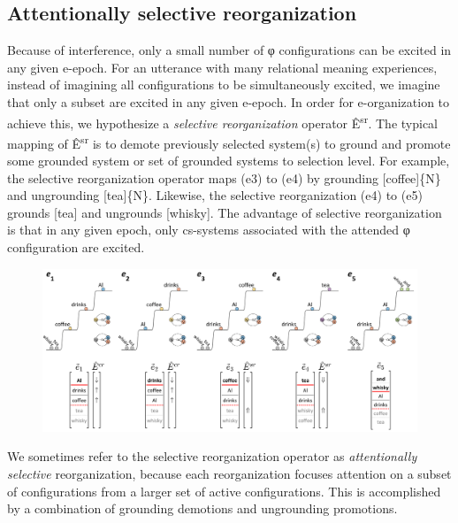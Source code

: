 \subsection{Attentionally selective reorganization}

Because of interference, only a small number of φ configurations can be excited in any given e-epoch. For an utterance with many relational meaning experiences, instead of imagining all configurations to be simultaneously excited, we imagine that only a subset are excited in any given e-epoch. In order for e-organization to achieve this, we hypothesize a \textit{selective reorganization} operator Ê\textsuperscript{sr}. The typical mapping of  Ê\textsuperscript{sr} is to demote previously selected system(s) to ground and promote some grounded system or set of grounded systems to selection level. For example, the selective reorganization operator maps (e3) to (e4) by grounding [coffee]\{N\} and ungrounding [tea]\{N\}. Likewise, the selective reorganization (e4) to (e5) grounds [tea] and ungrounds [whisky]. The advantage of selective reorganization is that in any given epoch, only cs-systems associated with the attended φ configuration are excited.

  
\begin{figure}
\includegraphics[width=\textwidth]{figures/Tilsen-img99.png}
\caption{\missingcaption}
\label{fig:}
\end{figure}
   

  We sometimes refer to the selective reorganization operator as \textit{attentionally selective} reorganization, because each reorganization focuses attention on a subset of configurations from a larger set of active configurations. This is accomplished by a combination of grounding demotions and ungrounding promotions.

